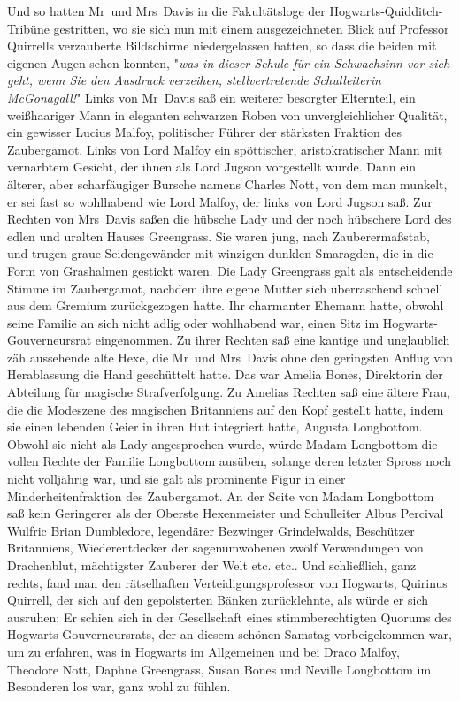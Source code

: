 {Und so hatten Mr~und Mrs~Davis in die Fakultätsloge der Hogwarts-Quidditch-Tribüne gestritten, wo sie sich nun mit einem ausgezeichneten Blick auf Professor Quirrells verzauberte Bildschirme niedergelassen hatten, so dass die beiden mit eigenen Augen sehen konnten, "\emph{was in dieser Schule für ein Schwachsinn vor sich geht, wenn Sie den Ausdruck verzeihen, stellvertretende Schulleiterin McGonagall!}" Links von Mr~Davis saß ein weiterer besorgter Elternteil, ein weißhaariger Mann in eleganten schwarzen Roben von unvergleichlicher Qualität, ein gewisser Lucius Malfoy, politischer Führer der stärksten Fraktion des Zaubergamot. Links von Lord Malfoy ein spöttischer, aristokratischer Mann mit vernarbtem Gesicht, der ihnen als Lord Jugson vorgestellt wurde. Dann ein älterer, aber scharfäugiger Bursche namens Charles Nott, von dem man munkelt, er sei fast so wohlhabend wie Lord Malfoy, der links von Lord Jugson saß. Zur Rechten von Mrs~Davis saßen die hübsche Lady und der noch hübschere Lord des edlen und uralten Hauses Greengrass. Sie waren jung, nach Zauberermaßstab, und trugen graue Seidengewänder mit winzigen dunklen Smaragden, die in die Form von Grashalmen gestickt waren. Die Lady Greengrass galt als entscheidende Stimme im Zaubergamot, nachdem ihre eigene Mutter sich überraschend schnell aus dem Gremium zurückgezogen hatte. Ihr charmanter Ehemann hatte, obwohl seine Familie an sich nicht adlig oder wohlhabend war, einen Sitz im Hogwarts-Gouverneursrat eingenommen. Zu ihrer Rechten saß eine kantige und unglaublich zäh aussehende alte Hexe, die Mr~und Mrs~Davis ohne den geringsten Anflug von Herablassung die Hand geschüttelt hatte. Das war Amelia Bones, Direktorin der Abteilung für magische Strafverfolgung. Zu Amelias Rechten saß eine ältere Frau, die die Modeszene des magischen Britanniens auf den Kopf gestellt hatte, indem sie einen lebenden Geier in ihren Hut integriert hatte, Augusta Longbottom. Obwohl sie nicht als Lady angesprochen wurde, würde Madam Longbottom die vollen Rechte der Familie Longbottom ausüben, solange deren letzter Spross noch nicht volljährig war, und sie galt als prominente Figur in einer Minderheitenfraktion des Zaubergamot. An der Seite von Madam Longbottom saß kein Geringerer als der Oberste Hexenmeister und Schulleiter Albus Percival Wulfric Brian Dumbledore, legendärer Bezwinger Grindelwalds, Beschützer Britanniens, Wiederentdecker der sagenumwobenen zwölf Verwendungen von Drachenblut, mächtigster Zauberer der Welt etc. etc.. Und schließlich, ganz rechts, fand man den rätselhaften Verteidigungsprofessor von Hogwarts, Quirinus Quirrell, der sich auf den gepolsterten Bänken zurücklehnte, als würde er sich ausruhen; Er schien sich in der Gesellschaft eines stimmberechtigten Quorums des Hogwarts-Gouverneursrats, der an diesem schönen Samstag vorbeigekommen war, um zu erfahren, was in Hogwarts im Allgemeinen und bei Draco Malfoy, Theodore Nott, Daphne Greengrass, Susan Bones und Neville Longbottom im Besonderen los war, ganz wohl zu fühlen.

}
